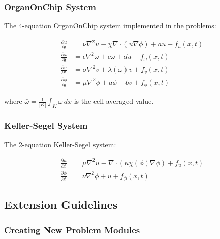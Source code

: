 \subsubsection{OrganOnChip System}

The 4-equation OrganOnChip system implemented in the problems:

\begin{align}
\frac{\partial u}{\partial t} &= \nu \nabla^2 u - \chi \nabla \cdot (u \nabla \phi) + a u + f_u(x,t) \\
\frac{\partial \omega}{\partial t} &= \epsilon \nabla^2 \omega + c \omega + d u + f_\omega(x,t) \\
\frac{\partial v}{\partial t} &= \sigma \nabla^2 v + \lambda(\bar{\omega}) v + f_v(x,t) \\
\frac{\partial \phi}{\partial t} &= \mu \nabla^2 \phi + a \phi + b v + f_\phi(x,t)
\end{align}

where $\bar{\omega} = \frac{1}{|K|} \int_K \omega \, dx$ is the cell-averaged value.

\subsubsection{Keller-Segel System}

The 2-equation Keller-Segel system:

\begin{align}
\frac{\partial u}{\partial t} &= \mu \nabla^2 u - \nabla \cdot (u \chi(\phi) \nabla \phi) + f_u(x,t) \\
\frac{\partial \phi}{\partial t} &= \nu \nabla^2 \phi + u + f_\phi(x,t)
\end{align}

\subsection{Extension Guidelines}
\label{subsec:extension_guidelines}

\subsubsection{Creating New Problem Modules}

